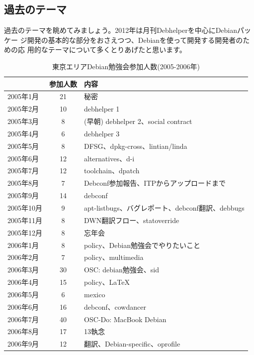 \documentclass[mingoth,a4paper]{jsarticle}
\begin{document}
\subsection{過去のテーマ}

過去のテーマを眺めてみましょう。2012年は月刊Debhelperを中心にDebianパッケー
ジ開発の基本的な部分をおさえつつ、Debianを使って開発する開発者のための応
用的なテーマについて多くとりあげたと思います。

\begin{table}[ht]
\begin{minipage}{0.5\hsize}
 \caption{東京エリアDebian勉強会参加人数(2005-2006年)}\label{tab:count2005}
 \begin{center}
  \begin{tabular}{|l|c|p{10em}|}
 \hline
   & 参加人数 & 内容 \\
 \hline
   2005年1月 & 21 & 秘密\\
   2005年2月 & 10 & debhelper 1\\
   2005年3月 & 8 &  (早朝) debhelper 2、social contract\\
   2005年4月 & 6 & debhelper 3\\
   2005年5月 & 8 & DFSG、dpkg-cross、lintian/linda\\
   2005年6月 & 12 & alternatives、d-i\\
   2005年7月 & 12 & toolchain、dpatch\\
   2005年8月 & 7 & Debconf参加報告、ITPからアップロードまで\\
   2005年9月 & 14 & debconf\\
   2005年10月 & 9 & apt-listbugs、バグレポート、debconf翻訳、debbugs\\
   2005年11月 & 8 & DWN翻訳フロー、statoverride\\
   2005年12月 & 8 & 忘年会\\
   2006年1月 & 8 & policy、Debian勉強会でやりたいこと\\
   2006年2月 & 7 & policy、multimedia \\
   2006年3月 & 30 & OSC: debian勉強会、sid \\
   2006年4月 & 15 & policy、\LaTeX{} \\
   2006年5月 & 6 & mexico \\
   2006年6月 & 16 & debconf、cowdancer\\
   2006年7月 & 40 & OSC-Do: MacBook Debian \\
   2006年8月 & 17 & 13執念 \\
   2006年9月 & 12 & 翻訳、Debian-specific、oprofile \\

\end{tabular}
\end{center}
\end{minipage}
\end{table}
\end{document}
